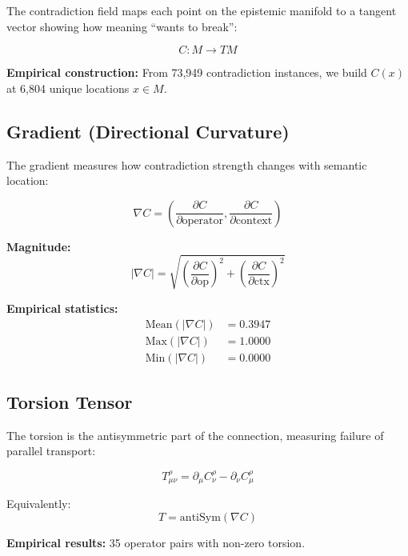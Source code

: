 \documentclass{article}
\begin{document}
The contradiction field maps each point on the epistemic manifold to a tangent vector showing how meaning ``wants to break'':

\begin{equation}
C: M \to TM
\end{equation}

\textbf{Empirical construction:} From 73,949 contradiction instances, we build $C(x)$ at 6,804 unique locations $x \in M$.

\subsection{Gradient (Directional Curvature)}

The gradient measures how contradiction strength changes with semantic location:

\begin{equation}
\nabla C = \left( \frac{\partial C}{\partial \text{operator}}, \frac{\partial C}{\partial \text{context}} \right)
\end{equation}

\textbf{Magnitude:}
\begin{equation}
|\nabla C| = \sqrt{\left(\frac{\partial C}{\partial \text{op}}\right)^2 + \left(\frac{\partial C}{\partial \text{ctx}}\right)^2}
\end{equation}

\textbf{Empirical statistics:}
\begin{align*}
\text{Mean}(|\nabla C|) &= 0.3947 \\
\text{Max}(|\nabla C|) &= 1.0000 \\
\text{Min}(|\nabla C|) &= 0.0000
\end{align*}

\subsection{Torsion Tensor}

The torsion is the antisymmetric part of the connection, measuring failure of parallel transport:

\begin{equation}
\boxed{T^\rho_{\mu\nu} = \partial_\mu C^\rho_\nu - \partial_\nu C^\rho_\mu}
\end{equation}

Equivalently:
\begin{equation}
T = \text{antiSym}(\nabla C)
\end{equation}

\textbf{Empirical results:} 35 operator pairs with non-zero torsion.
\end{document}
